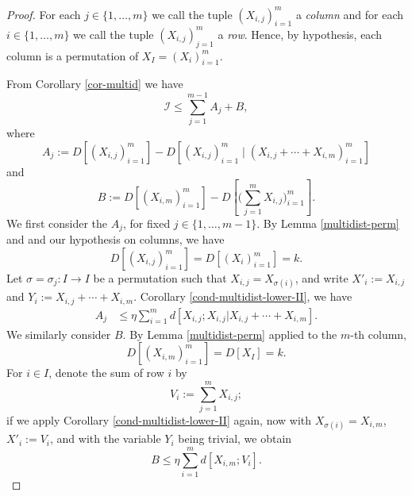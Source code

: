 \begin{proof}
  For each $j \in \{1,\dots,m\}$ we call the tuple $(X_{i,j})_{i = 1}^m$ a \emph{column} and for each $i \in \{1,\dots, m\}$ we call the tuple $(X_{i,j})_{j = 1}^m$ a \emph{row}. Hence, by hypothesis, each column is a permutation of $X_I = (X_i)_{i=1}^m$.

From Corollary \ref{cor-multid} we have
\begin{equation}\label{441} {\mathcal I} \leq \sum_{j=1}^{m-1} A_j + B,\end{equation}
where
\[
  A_j := D[ (X_{i, j})_{i = 1}^m] - D[ (X_{i, j})_{i = 1}^m  \; \big| \; (X_{i,j} + \cdots + X_{i,m})_{i =1}^m  ]
\]
and
\[
  B := D[ (X_{i,m})_{i=1}^m ] - D[ \bigl(\sum_{j=1}^m X_{i,j}\bigr)_{i=1}^m ].
\]
We first consider the $A_j$, for fixed $j \in \{1,\dots, m-1\}$.
By Lemma \ref{multidist-perm} and and our hypothesis on columns, we have
\[
  D[ (X_{i, j})_{i = 1}^m ]= D[ (X_i)_{i=1}^m ] = k.
\]
Let $\sigma = \sigma_j \colon I \to I$ be a permutation such that $X_{i,j} = X_{\sigma(i)}$, and write $X'_i := X_{i,j}$ and $Y_i := X_{i,j} + \cdots + X_{i,m}$.
Corollary \ref{cond-multidist-lower-II}, we have
\begin{align}
  A_j & \leq \eta \sum_{i = 1}^m d[X_{i,j}; X_{i, j}|X_{i, j} + \cdots + X_{i,m}].\label{54a}
\end{align}
We similarly consider $B$.  By Lemma \ref{multidist-perm} applied to the $m$-th column,
\[
  D[ (X_{i, m})_{i = 1}^m ] = D[X_I] = k.
\]
For $i \in I$, denote the sum of row $i$ by
\[
  V_i := \sum_{j=1}^m X_{i,j};
\]
if we apply Corollary \ref{cond-multidist-lower-II} again, now with $X_{\sigma(i)} = X_{i,m}$, $X'_i := V_i$, and with the variable $Y_i$ being trivial, we obtain
\begin{equation}\label{55a}
  B \leq \eta \sum_{i = 1}^m d[X_{i,m}; V_i].
\end{equation}


\end{proof}
